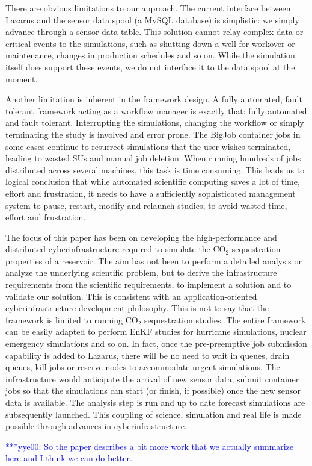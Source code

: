\documentclass{acm_proc_article-sp}
\newcommand{\yyenote}[1]{ {\textcolor{blue} { ***yye00: #1 }}}
\newcommand{\yyenote}[1]{}
\begin{document}
There are obvious limitations to our approach. The current interface
between Lazarus and the sensor data spool (a MySQL database) is simplistic:
we simply advance through a sensor data table. This solution cannot
relay complex data or critical events to the simulations, such as
shutting down a well for workover or maintenance, changes in production
schedules and so on. While the simulation itself does support
these events, we do not interface it to the data spool at the moment.

Another limitation is inherent in the framework design. A fully
automated, fault tolerant framework acting as a workflow manager
is exactly that: fully automated and fault tolerant. Interrupting
the simulations, changing the workflow or simply terminating
the study is involved and error prone. The BigJob container jobs
in some cases continue to resurrect simulations that the user wishes
terminated, leading to wasted SUs and manual job deletion. When running
hundreds of jobs distributed across several machines, this task is time consuming.
This leads us to logical conclusion that while automated scientific
computing saves a lot of time, effort and frustration, it needs to have
a sufficiently sophisticated management system to pause, restart,
modify and relaunch studies, to avoid wasted time, effort and
frustration.

The focus of this paper has been on developing the high-performance
and distributed cyberinfrastructure required to simulate the CO$_2$
sequestration properties of a reservoir. The aim has not been to
perform a detailed analysis or analyze the underlying scientific
problem, but to derive the infrastructure requirements from the
scientific requirements, to implement a solution and to validate our
solution. This is consistent with an application-oriented
cyberinfrastructure development philosophy. This is not to say
that the framework is limited to running CO$_2$ sequestration studies.
The entire framework can be easily adapted to perform EnKF
studies for hurricane simulations, nuclear emergency simulations 
and so on. In fact, once the pre-preemptive job submission
capability is added to Lazarus, there will be no need
to wait in queues, drain queues, kill jobs or reserve nodes to accommodate urgent
simulations. The infrastructure would anticipate the arrival of
new sensor data, submit container jobs so that the simulations
can start (or finish, if possible) once the new sensor data is available.
The analysis step is run and up to date forecast simulations are subsequently launched.
This coupling of science, simulation and real life is made
possible through advances in cyberinfrastructure.



\yyenote{So the paper describes a bit more work that we actually
  summarize here and I think we can do better.}

%


\end{document}
